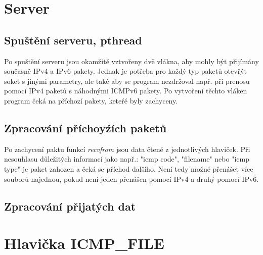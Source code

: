 \documentclass[a4paper, 11pt]{article}
\begin{document}
\newpage
\section{Server}

\subsection{Spuštění serveru, pthread}
Po spuštění serveru jsou okamžitě vztvořeny dvě vlákna, aby mohly být přijímány současně IPv4 a IPv6 pakety. Jednak je potřeba pro každý typ paketů otevřýt soket s jinými parametry, ale také aby se program nezdržoval např. při prenosu pomocí IPv4 paketů s náhodnými ICMPv6 pakety. Po vytvoření těchto vláken program čeká na příchozí pakety, keteŕé byly zachyceny.

\subsection{Zpracování příchoyźích paketů}
Po zachycení paktu funkcí \textit{recvfrom} jsou data čtené z jednotlivých hlaviček. Při nesouhlasu důležitých informací jako např.: "icmp code", "filename" nebo "icmp type" je paket zahozen a čeká se příchod dalšího. Není tedy možné přenášet více souborů najednou, pokud není jeden přenášen pomocí IPv4 a druhý pomocí IPv6.

\subsection{Zpracování přijatých dat}

\section{Hlavička ICMP\_FILE}
\end{document}
